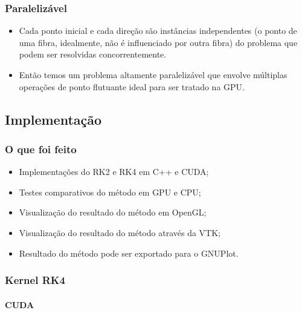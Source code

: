 \documentclass[brazil, 10pt]{beamer}
\begin{document}
\begin{frame}
  \frametitle{Paralelizável}
  
  \begin{itemize}
    \item Cada ponto inicial e cada direção são instâncias independentes (o ponto de uma fibra, idealmente, não é influenciado por outra fibra) do problema que podem ser resolvidas concorrentemente.
    \item Então temos um problema altamente paralelizável que envolve múltiplas operações de ponto flutuante ideal para ser tratado na GPU.
  \end{itemize}
\end{frame}

\subsection{Implementação}
\begin{frame}
  \frametitle{O que foi feito}

  \begin{itemize}
    \item Implementações do RK2 e RK4 em C++ e CUDA;
    \item Testes comparativos do método em GPU e CPU;
    \item Visualização do resultado do método em OpenGL;
    \item Visualização do resultado do método através da VTK;
    \item Resultado do método pode ser exportado para o GNUPlot.
  \end{itemize}
\end{frame}

\begin{frame}
  \frametitle{Kernel RK4}
  \framesubtitle{CUDA}
  
  
\end{frame}
\end{document}
